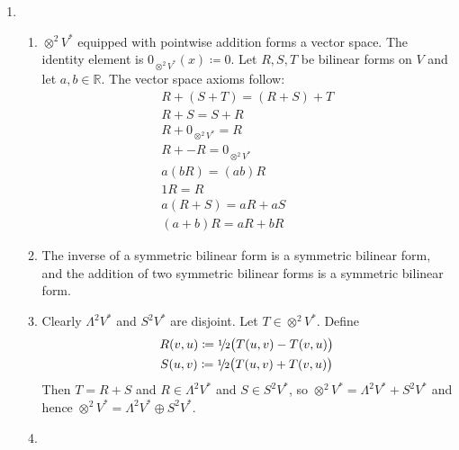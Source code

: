 \documentclass[a4paper, 12pt]{article}
\newcommand{\R}{\mathbb{R}}
\newcommand{\half}{\sfrac{1\!}2}
\begin{document}
\begin{enumerate}

\item \begin{enumerate}

\item \(\otimes^2V^*\) equipped with pointwise addition forms a vector space. The identity element is \(0_{\otimes^2V^*}(x)\coloneqq0\). Let \(R,S,T\) be bilinear forms on \(V\) and let \(a,b\in\R\). The vector space axioms follow:
\begin{gather*}
R+(S+T)=(R+S)+T\\
R+S=S+R\\
R+0_{\otimes^2V^*}=R\\
R+-R=0_{\otimes^2V^*}\\
a(bR)=(ab)R\\
1R=R\\
a(R+S)=aR+aS\\
(a+b)R=aR+bR
\end{gather*}

\item The inverse of a symmetric bilinear form is a symmetric bilinear form, and the addition of two symmetric bilinear forms is a symmetric bilinear form.

\item Clearly \(\Lambda^2V^*\) and \(S^2V^*\) are disjoint. Let \(T\in\otimes^2V^*\). Define
\begin{gather*}
R(v,u)\coloneqq\half\big(T(u,v)-T(v,u)\big)\\
S(u,v)\coloneqq\half\big(T(u,v)+T(v,u)\big)
\end{gather*}
Then \(T=R+S\) and \(R\in\Lambda^2V^*\) and \(S\in S^2V^*\), so \(\otimes^2V^*=\Lambda^2V^*+S^2V^*\) and hence \(\otimes^2V^*=\Lambda^2V^*\oplus S^2V^*\).

\item 

\end{enumerate}

\end{enumerate}
\end{document}
